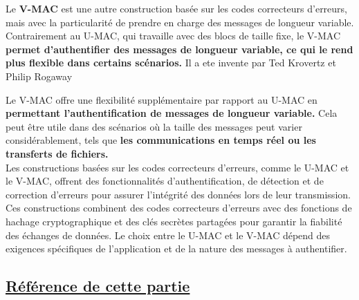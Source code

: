 Le \textbf{V-MAC} est une autre construction basée sur les codes correcteurs d'erreurs, mais avec la particularité de prendre en charge des messages de longueur variable. Contrairement au U-MAC, qui travaille avec des blocs de taille fixe, le V-MAC \textbf{permet d'authentifier des messages de longueur variable, ce qui le rend plus flexible dans certains scénarios.} Il a ete invente par Ted Krovertz et Philip Rogaway


Le V-MAC offre une flexibilité supplémentaire par rapport au U-MAC en \textbf{permettant l'authentification de messages de longueur variable.} Cela peut être utile dans des scénarios où la taille des messages peut varier considérablement, tels que \textbf{les communications en temps réel ou les transferts de fichiers.}\\

Les constructions basées sur les codes correcteurs d'erreurs, comme le U-MAC et le V-MAC, offrent des fonctionnalités d'authentification, de détection et de correction d'erreurs pour assurer l'intégrité des données lors de leur transmission. Ces constructions combinent des codes correcteurs d'erreurs avec des fonctions de hachage cryptographique et des clés secrètes partagées pour garantir la fiabilité des échanges de données. Le choix entre le U-MAC et le V-MAC dépend des exigences spécifiques de l'application et de la nature des messages à authentifier.


\subsection{\textbf{\underline{Référence de cette partie}}}
\begin{center}
    \cite{frwiki:208453934}\\
    \cite{fouque:des-aes}\\
    \cite{frwiki:202365614}\\
    \cite{image:cbc-mac}\\
    \cite{wiki:hash_function}\\
    \cite{okta:hmac}\\
    \cite{okta:umac}\\
    \cite{geeksfg}\\
    \cite{wiki:hmac}\\
    \cite{wiki:umac}\\
    \cite{ionos:hash_function}\\
    \cite{bellare1996new}\\
    \cite{contini2006forgery}\\
    \cite{dodis2012message}
    
\end{center}